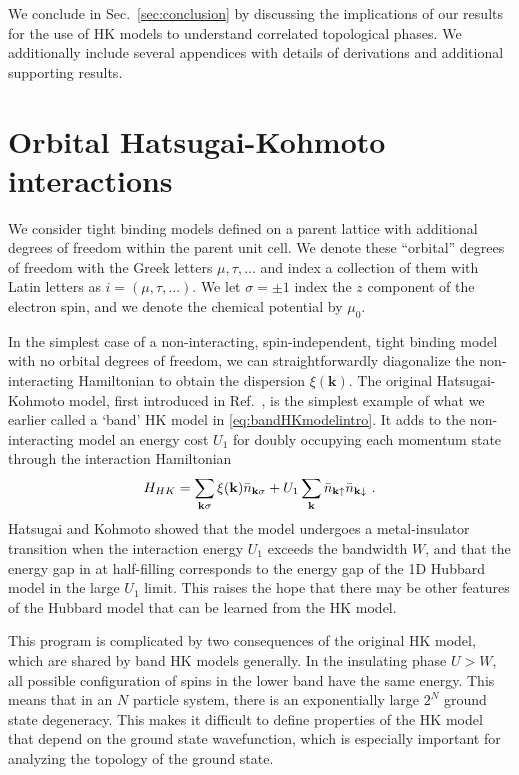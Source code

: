\documentclass[prb,aps,amssymb,twocolumn,notitlepage]{revtex4-2}
\begin{document}
We conclude in Sec.~\ref{sec:conclusion} by discussing the implications of our results for the use of HK models to understand correlated topological phases. 
We additionally include several appendices with details of derivations and additional supporting results.

\section{Orbital Hatsugai-Kohmoto interactions}\label{sec:orbital-hk}
We consider tight binding models defined on a parent lattice with additional degrees of freedom within the parent unit cell. 
We denote these ``orbital'' degrees of freedom with the Greek letters $\mu,\tau, ...$ and index a collection of them with Latin letters as $i=(\mu,\tau,...)$. 
We let $\sigma=\pm 1$ index the $z$ component of the electron spin, and we denote the chemical potential by $\mu_0$. 

In the simplest case of a non-interacting, spin-independent, tight binding model with no orbital degrees of freedom, we can straightforwardly diagonalize the non-interacting Hamiltonian to obtain the dispersion $\xi(\mathbf{k})$. 
The original Hatsugai-Kohmoto model, first introduced in Ref.~\cite{TheOGHK1992}, is the simplest example of what we earlier called a `band' HK model in \cref{eq:bandHKmodelintro}. 
It adds to the non-interacting model an energy cost $U_{1}$ for doubly occupying each momentum state through the interaction Hamiltonian
\begin{equation}
\label{eq:originalHK}
H_{HK}=\sum_{\mathbf{k}\sigma}\xi(\mathbf{k})\Bar{n}_{\mathbf{k}\sigma}+U_{1}\sum_{\mathbf{k}}\Bar{n}_{\mathbf{k}\uparrow}\Bar{n}_{\mathbf{k}\downarrow}\text{ }.
\end{equation} 
Hatsugai and Kohmoto showed that the model undergoes a metal-insulator transition when the interaction energy $U_1$ exceeds the bandwidth $W$, and that the energy gap in  at half-filling corresponds to the energy gap of the 1D Hubbard model in the large $U_1$ limit. 
This raises the hope that there may be other features of the Hubbard model that can be learned from the HK model.

This program is complicated by two consequences of the original HK model, which are shared by band HK models generally. 
In the insulating phase $U>W$, all possible configuration of spins in the lower band have the same energy. 
This means that in an $N$ particle system, there is an exponentially large $2^N$ ground state degeneracy. 
This makes it difficult to define properties of the HK model that depend on the ground state wavefunction, which is especially important for analyzing the topology of the ground state.
\end{document}

